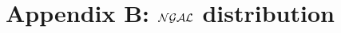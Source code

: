 \documentclass[12pt,a4paper]{article}\usepackage[]{graphicx}\usepackage[]{color}\usepackage{subfigure}
\newcommand{\mathD}{\mathcal{D}}
\begin{document}

\section*{Appendix B: $\cal{NGAL}$ distribution}
\end{document}
